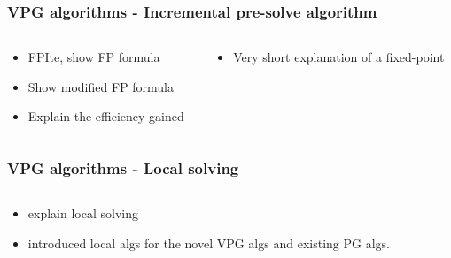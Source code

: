 \documentclass[aspectratio=169]{beamer}
\begin{document}

\begin{frame}[t]
\frametitle{VPG algorithms - Incremental pre-solve algorithm}
\begin{columns}[t]
	\begin{column}{0.5\textwidth}
		\begin{itemize}
			\item FPIte, show FP formula
			\item Show modified FP formula
			\item Explain the efficiency gained
		\end{itemize}
	\end{column}
	\begin{column}{0.5\textwidth}
		\begin{itemize}
			\item Very short explanation of a fixed-point
		\end{itemize}
	\end{column}
\end{columns}
\end{frame}


\begin{frame}[t]
\frametitle{VPG algorithms - Local solving}
\begin{columns}[t]
	\begin{column}{0.5\textwidth}
		\begin{itemize}
			\item explain local solving
			\item introduced local algs for the novel VPG algs and existing PG algs.
		\end{itemize}
	\end{column}
	\begin{column}{0.5\textwidth}
	\end{column}
\end{columns}
\end{frame}

\end{document}
